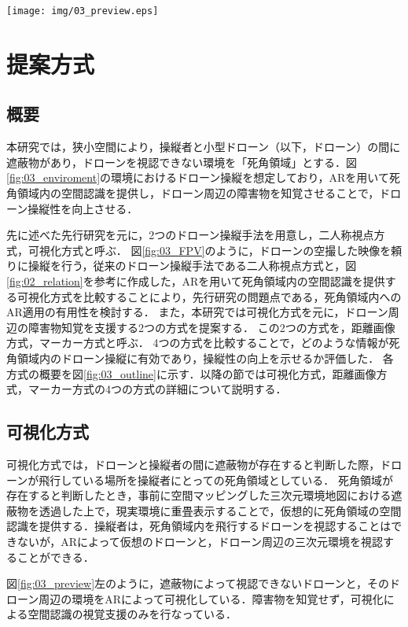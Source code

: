\documentclass[submit]{ipsj}
\begin{document}
  
  \begin{figure*}[!tb]
    \centering
    \texttt{[image: img/03\_preview.eps]}
    \caption{各方式の概要および操縦者目線}
    \label{fig:03_preview}
  \end{figure*}




\section{提案方式}
\subsection{概要}
本研究では，狭小空間により，操縦者と小型ドローン（以下，ドローン）の間に遮蔽物があり，ドローンを視認できない環境を「死角領域」とする．図\ref{fig:03_enviroment}の環境におけるドローン操縦を想定しており，ARを用いて死角領域内の空間認識を提供し，ドローン周辺の障害物を知覚させることで，ドローン操縦性を向上させる．
\par
先に述べた先行研究\cite{article-ar05}を元に，2つのドローン操縦手法を用意し，二人称視点方式，可視化方式と呼ぶ．
図\ref{fig:03_FPV}のように，ドローンの空撮した映像を頼りに操縦を行う，従来のドローン操縦手法である二人称視点方式と，図\ref{fig:02_relation}を参考に作成した，ARを用いて死角領域内の空間認識を提供する可視化方式を比較することにより，先行研究の問題点である，死角領域内へのAR適用の有用性を検討する．
また，本研究では可視化方式を元に，ドローン周辺の障害物知覚を支援する2つの方式を提案する．
この2つの方式を，距離画像方式，マーカー方式と呼ぶ．
4つの方式を比較することで，どのような情報が死角領域内のドローン操縦に有効であり，操縦性の向上を示せるか評価した．
各方式の概要を図\ref{fig:03_outline}に示す．以降の節では可視化方式，距離画像方式，マーカー方式の4つの方式の詳細について説明する．

\subsection{可視化方式}
可視化方式では，ドローンと操縦者の間に遮蔽物が存在すると判断した際，ドローンが飛行している場所を操縦者にとっての死角領域としている．
死角領域が存在すると判断したとき，事前に空間マッピングした三次元環境地図における遮蔽物を透過した上で，現実環境に重畳表示することで，仮想的に死角領域の空間認識を提供する．操縦者は，死角領域内を飛行するドローンを視認することはできないが，ARによって仮想のドローンと，ドローン周辺の三次元環境を視認することができる．
\par
図\ref{fig:03_preview}左のように，遮蔽物によって視認できないドローンと，そのドローン周辺の環境をARによって可視化している．障害物を知覚せず，可視化による空間認識の視覚支援のみを行なっている．
\end{document}
